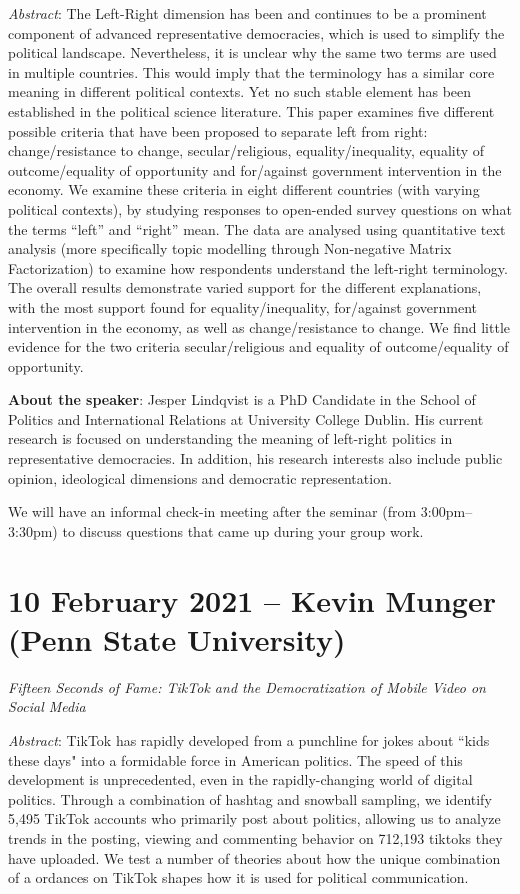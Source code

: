 \documentclass[abstract=on,parskip=full,headings=standardclasses,fontsize=11pt,paper=a4]{scrartcl}
\begin{document}
\textit{Abstract}: The Left-Right dimension has been and continues to be a prominent component of advanced representative democracies, which is used to simplify the political landscape. Nevertheless, it is unclear why the same two terms are used in multiple countries. This would imply that the terminology has a similar core meaning in different political contexts. Yet no such stable element has been established in the political science literature. This paper examines five different possible criteria that have been proposed to separate left from right: change/resistance to change, secular/religious, equality/inequality, equality of outcome/equality of opportunity and for/against government intervention in the economy. We examine these criteria in eight different countries (with varying political contexts), by studying responses to open-ended survey questions on what the terms ``left'' and ``right'' mean. The data are analysed using quantitative text analysis (more specifically topic modelling through Non-negative Matrix Factorization) to examine how respondents understand the left-right terminology. The overall results demonstrate varied support for the different explanations, with the most support found for equality/inequality, for/against government intervention in the economy, as well as change/resistance to change. We find little evidence for the two criteria secular/religious and equality of outcome/equality of opportunity.


\textbf{About the speaker}: Jesper Lindqvist is a PhD Candidate in the School of Politics and International Relations at University College Dublin. His current research is focused on understanding the meaning of left-right politics in representative democracies. In addition, his research interests also include public opinion, ideological dimensions and democratic representation.


We will have an informal check-in meeting after the seminar (from 3:00pm--3:30pm) to discuss questions that came up during your group work.

\section{10 February 2021 -- Kevin Munger (Penn State University)}
 
 
\textit{Fifteen Seconds of Fame: TikTok and the Democratization of Mobile Video on Social Media}


\textit{Abstract}: TikTok has rapidly developed from a punchline for jokes about “kids these days" into a formidable force in American politics. The speed of this development is unprecedented, even in the rapidly-changing world of digital politics. Through a combination of hashtag and snowball sampling, we identify 5,495 TikTok accounts who primarily post about politics, allowing us to analyze trends in the posting, viewing and commenting behavior on 712,193 tiktoks they have uploaded. We test a number of theories about how the unique combination of a ordances on TikTok shapes how it is used for political communication.
\end{document}
